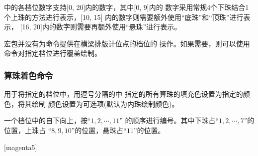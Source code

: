 \documentclass[full]{l3doc}
\begin{document}
\begin{documentation}
  中的各档位数字支持[0, 20]内的数字，其中[0, 9]内的
  数字采用常规4个下珠结合1个上珠的方法进行表示，[10, 15]
  内的数字则需要额外使用\enquote{底珠}和\enquote{顶珠}进行表示，
  [16, 20]内的数字则需要再额外使用\enquote{悬珠}进行表示。

  \begin{notezh}
    宏包并没有为命令提供在横梁排版计位点的档位的
    操作。如果需要，则可以使用命令对指定档位进行覆盖绘制。
  \end{notezh}

\begin{SideBySideExample}[frame=single,numbers=left,%
    xrightmargin=.48\linewidth,gobble=2]
  \centering
  \begin{suanpan}
  \end{suanpan}
\end{SideBySideExample}


\subsubsection{算珠着色命令}

\begin{function}{\bid}
  \begin{syntax}
     
  \end{syntax}
\end{function}

  用于将指定的档位中，用逗号分隔的中
  指定的所有算珠的填充色设置为指定的颜色，将其绘制
  颜色设置为可选项(默认为内珠绘制颜色)。

  一个档位中的自下向上，按\enquote{$1, 2, \cdots, 11$}%
  的顺序进行编号。其中下珠占\enquote{$1, 2, \cdots, 7$}的位置，上珠占
  \enquote{$8, 9, 10$}的位置，悬珠占\enquote{$11$}的位置。

\begin{SideBySideExample}[frame=single,numbers=left,%
    xrightmargin=.48\linewidth,gobble=2]
  \centering
  \begin{suanpan}
    [magenta5]
  \end{suanpan}
\end{SideBySideExample}


\end{documentation}
\end{document}
